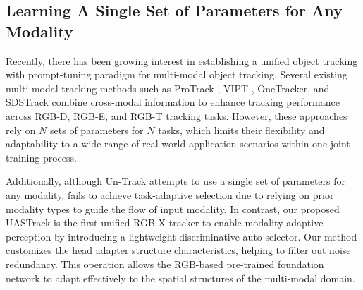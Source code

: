 \subsection{Learning A Single Set of Parameters for Any Modality}
Recently, there has been growing interest in establishing a unified object tracking with prompt-tuning paradigm for multi-modal object tracking. 
Several existing multi-modal tracking methods such as ProTrack \cite{protrack}, VIPT \cite{VIPT}, OneTracker, and SDSTrack \cite{sdstrack} combine cross-modal information to enhance tracking performance across RGB-D, RGB-E, and RGB-T tracking tasks. 
However, these approaches rely on $N$ sets of parameters for $N$ tasks, which limits their flexibility and adaptability to a wide range of real-world application scenarios within one joint training process.

Additionally, although Un-Track \cite{untrack} attempts to use a single set of parameters for any modality, fails to achieve task-adaptive selection due to relying on prior modality types to guide the flow of input modality. 
In contrast, our proposed UASTrack is the first unified RGB-X tracker to enable modality-adaptive perception by introducing a lightweight discriminative auto-selector.
Our method customizes the head adapter structure characteristics, helping to filter out noise redundancy. 
This operation allows the RGB-based pre-trained foundation network to adapt effectively to the spatial structures of the multi-modal domain.